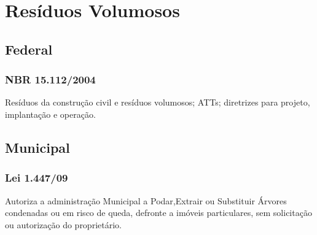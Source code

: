 \section{Resíduos Volumosos}
\begin{subapend}
	\subsection{Federal}
	\begin{subsubapend}
		\item \subsubsection{NBR 15.112/2004}
		Resíduos da construção civil e resíduos volumosos; ATTs; diretrizes para projeto, implantação e operação.
	\end{subsubapend}
\end{subapend}

\begin{subapend}
	\subsection{Municipal}
	\begin{subsubapend}
		\item \subsubsection{Lei 1.447/09}
		Autoriza a administração Municipal a Podar,Extrair ou Substituir Árvores condenadas ou em risco de queda, defronte a imóveis particulares, sem solicitação ou autorização do proprietário.
	\end{subsubapend}
\end{subapend}



